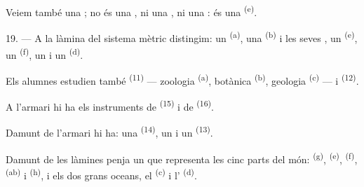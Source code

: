 Veiem també una ; no és una , ni una
, ni una : és una 
\textsuperscript{(e)}.

19. --- A la làmina del sistema mètric distingim: un 
\textsuperscript{(a)}, una  \textsuperscript{(b)} i les seves
, un  \textsuperscript{(e)}, un 
\textsuperscript{(f)}, un  i un 
\textsuperscript{(d)}.

Els alumnes estudien també  \textsuperscript{(11)} ---
zoologia \textsuperscript{(a)}, botànica \textsuperscript{(b)}, geologia
\textsuperscript{(c)} --- i  \textsuperscript{(12)}.

A l'armari hi ha els instruments de  \textsuperscript{(15)} i de
 \textsuperscript{(16)}.

Damunt de l'armari hi ha: una  \textsuperscript{(14)}, un
 i un  \textsuperscript{(13)}.

Damunt de les làmines penja un  que representa les cinc parts del
món:  \textsuperscript{(g)}, 
\textsuperscript{(e)},  \textsuperscript{(f)},
 \textsuperscript{(ab)} i 
\textsuperscript{(h)}, i els dos grans oceans, el 
\textsuperscript{(c)} i l' \textsuperscript{(d)}.
\VUsaut{6.0mm}
\VUfilet{22mm}
